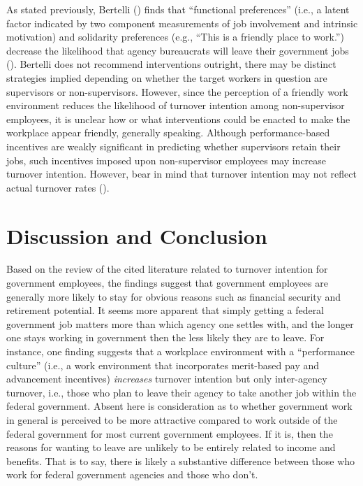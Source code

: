 \documentclass[
  11pt,
  a4paper,
]{article}
\begin{document}
As stated previously, Bertelli () finds
that ``functional preferences'' (i.e., a latent factor indicated by two
component measurements of job involvement and intrinsic motivation) and
solidarity preferences (e.g., ``This is a friendly place to work.'')
decrease the likelihood that agency bureaucrats will leave their
government jobs (). Bertelli does
not recommend interventions outright, there may be distinct strategies
implied depending on whether the target workers in question are
supervisors or non-supervisors. However, since the perception of a
friendly work environment reduces the likelihood of turnover intention
among non-supervisor employees, it is unclear how or what interventions
could be enacted to make the workplace appear friendly, generally
speaking. Although performance-based incentives are weakly significant
in predicting whether supervisors retain their jobs, such incentives
imposed upon non-supervisor employees may increase turnover intention.
However, bear in mind that turnover intention may not reflect actual
turnover rates ().

\section{Discussion and Conclusion}\label{discussion-and-conclusion}

Based on the review of the cited literature related to turnover
intention for government employees, the findings suggest that government
employees are generally more likely to stay for obvious reasons such as
financial security and retirement potential. It seems more apparent that
simply getting a federal government job matters more than which agency
one settles with, and the longer one stays working in government then
the less likely they are to leave. For instance, one finding suggests
that a workplace environment with a ``performance culture'' (i.e., a
work environment that incorporates merit-based pay and advancement
incentives) \emph{increases} turnover intention but only inter-agency
turnover, i.e., those who plan to leave their agency to take another job
within the federal government. Absent here is consideration as to
whether government work in general is perceived to be more attractive
compared to work outside of the federal government for most current
government employees. If it is, then the reasons for wanting to leave
are unlikely to be entirely related to income and benefits. That is to
say, there is likely a substantive difference between those who work for
federal government agencies and those who don't.
\end{document}
